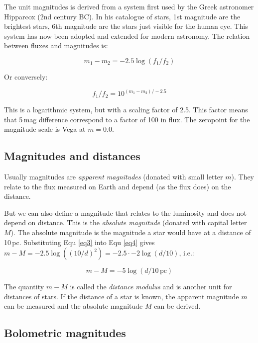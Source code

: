 The unit magnitudes is derived from a system first used by the Greek astronomer Hipparcox (2nd century BC). In his catalogue of stars, 1st magnitude are the brightest stars, 6th magnitude are the stars just visible for the human eye. This system has now been adopted and extended for modern astronomy. The relation between fluxes and magnitudes is:

\begin{equation}
m_1 - m_2 = -2.5 \log{(f_1 / f_2)}
\label{eq4}
\end{equation}

Or conversely:

\begin{equation}
f_1 / f_2 = 10^{(m_1 - m_2) / -2.5}
\label{eq5}
\end{equation}

This is a logarithmic system, but with a scaling factor of 2.5. This factor means that 5\,mag difference correspond to a factor of 100 in flux. The zeropoint for the magnitude scale is Vega at $m = 0.0$.

\subsection{Magnitudes and distances}

Usually magnitudes are \textit{apparent magnitudes} (donated with small letter $m$). They relate to the flux measured on Earth and depend (as the flux does) on the distance. 

But we can also define a magnitude that relates to the luminosity and does not depend on distance. This is the \textit{absolute magnitude} (donated with capital letter $M$). The absolute magnitude is the magnitude a star would have at a distance of 10\,pc. Substituting Equ \eqref{eq3} into Equ \eqref{eq4} gives $m - M = -2.5 \log{ ((10 / d)^2) } =   -2.5 \cdot -2 \log{(d/10)}$, i.e.:

\begin{equation}
m - M = -5 \log{(d/10\,\mathrm{pc})}
\label{eq6}
\end{equation}

The quantity $m-M$ is called the \textit{distance modulus} and is another unit for distances of stars. If the distance of a star is known, the apparent magnitude $m$ can be measured and the absolute magnitude $M$ can be derived. 

\subsection{Bolometric magnitudes}

